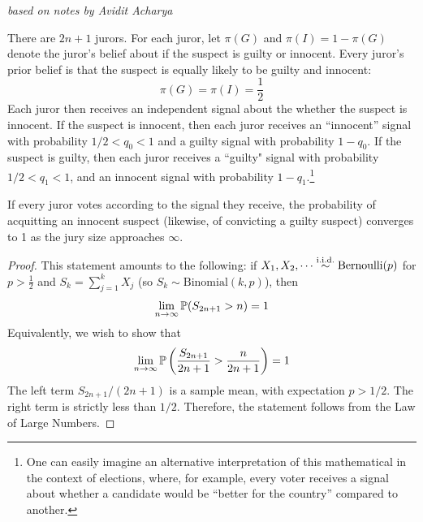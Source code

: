 \documentclass[../../../main.tex]{subfiles}
\begin{document}
\nocite{mclennan1998consequences}
\nocite{barelli2022full}
\nocite{austensmith1996information}

\textit{based on notes by Avidit Acharya}

\begin{definition}
    There are $2n+1$ jurors. 
    For each juror, let $\pi(G)$ and $\pi(I)=1-\pi(G)$ denote the juror's belief about if the suspect is guilty or innocent.
    Every juror's prior belief is that the suspect is equally likely to be guilty and innocent:
    \begin{equation*}
        \pi(G)=\pi(I)=\frac{1}{2}
    \end{equation*}
    Each juror then receives an independent signal about the whether the suspect is innocent.
    If the suspect is innocent, then each juror receives an ``innocent'' signal with probability $1/2<q_0<1$ and a guilty signal with probability $1-q_0$.
    If the suspect is guilty, then each juror receives a ``guilty" signal with probability $1/2<q_1<1$, and an innocent signal with probability $1-q_1$.\footnote{One can easily imagine an alternative interpretation of this mathematical in the context of elections, where, for example, every voter receives a signal about whether a candidate would be ``better for the country'' compared to another.}
\end{definition}

\begin{theorem}
    If every juror votes according to the signal they receive, the probability of acquitting an innocent suspect (likewise, of convicting a guilty suspect) converges to 1 as the jury size approaches $\infty$.
    \begin{proof}
        This statement amounts to the following: if $X_1,X_2,\cdots\overset{\mathrm{i.i.d.}}{\sim} \textrm{Bernoulli}(p)$ for $p>\frac{1}{2}$ and $S_k=\sum_{j=1}^k X_j$ (so $S_k\sim \textrm{Binomial}(k,p)$), then
        \begin{equation*}
            \lim_{n\rightarrow \infty}\mathbb{P}(S_{2n+1}>n)=1
        \end{equation*}
        Equivalently, we wish to show that 
        \begin{equation*}
            \lim_{n\rightarrow \infty}\mathbb{P}\left(\frac{S_{2n+1}}{2n+1}>\frac{n}{2n+1}\right)=1
        \end{equation*}
        The left term $S_{2n+1}/(2n+1)$ is a sample mean, with expectation $p>1/2$. 
        The right term is strictly less than $1/2$.
        Therefore, the statement follows from the Law of Large Numbers.
    \end{proof}
\end{theorem}
\end{document}
